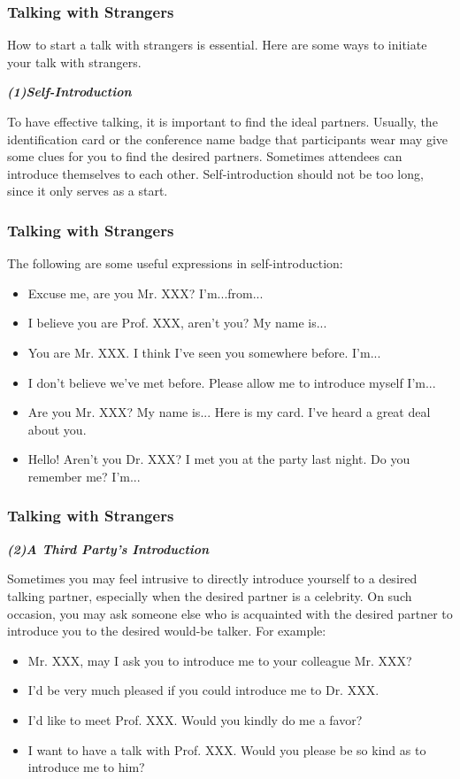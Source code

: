 \documentclass[aspectratio=169,UTF8,c]{beamer}%
\begin{document}
\begin{frame}
	\frametitle{Talking with Strangers}
	How to start a talk with strangers is essential. Here are some ways to initiate your talk with strangers.
	
	\emph{\textbf{(1)Self-Introduction}}
	
	To have effective talking, it is important to find the ideal partners. Usually, the identification card or the conference name badge that participants wear may give some clues for you to find the desired partners. Sometimes attendees can introduce themselves to each other. Self-introduction should not be too long, since it only serves as a start. 
\end{frame}
\begin{frame}
	\frametitle{Talking with Strangers}
	The following are some useful expressions in self-introduction:
	\begin{itemize}
		\item Excuse me, are you Mr. XXX? I'm...from...
		\item I believe you are Prof. XXX, aren't you? My name is...
		\item You are Mr. XXX. I think I've seen you somewhere before. I'm...
		\item I don't believe we've met before. Please allow me to introduce myself I'm...
		\item Are you Mr. XXX? My name is... Here is my card. I've heard a great deal about you.
		\item Hello! Aren't you Dr. XXX? I met you at the party last night. Do you remember me? I'm...
	\end{itemize}
\end{frame}
\begin{frame}
	\frametitle{Talking with Strangers}
	\emph{\textbf{(2)A Third Party's Introduction}}
	
	Sometimes you may feel intrusive to directly introduce yourself to a desired talking partner, especially when the desired partner is a celebrity. On such occasion, you may ask someone else who is acquainted with the desired partner to introduce you to the desired would-be talker. For example:
	\begin{itemize}
		\item Mr. XXX, may I ask you to introduce me to your colleague Mr. XXX?
		\item I'd be very much pleased if you could introduce me to Dr. XXX.
		\item I'd like to meet Prof. XXX. Would you kindly do me a favor?
		\item I want to have a talk with Prof. XXX. Would you please be so kind as to introduce me to him?
	\end{itemize}
\end{frame}
\end{document}
